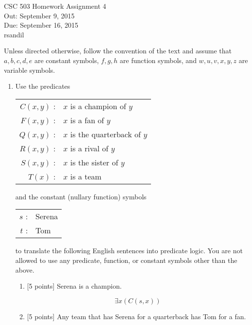 \documentclass{article}
\def\unityid{rsandil}
\begin{document}
\begin{center}
  {\LARGE CSC 503 Homework Assignment 4}\\[1pc]
  Out: September 9, 2015 \\
  Due: September 16, 2015 \\
  \unityid
\end{center}

Unless directed otherwise, follow the convention of the text and
assume that $a,b,c,d,e$ are constant symbols, $f,g,h$ are function
symbols, and $w,u,v,x,y,z$ are variable symbols.

\begin{enumerate}

\item Use the predicates
  \begin{center}
    \begin{tabular}{rl}
      $C(x,y)$ : & $x$ is a champion of $y$ \\
      $F(x,y)$ : & $x$ is a fan of $y$ \\
      $Q(x,y)$ : & $x$ is the quarterback of $y$ \\
      $R(x,y)$ : & $x$ is a rival of $y$ \\
      $S(x,y)$ : & $x$ is the sister of $y$ \\
      $T(x)$   : & $x$ is a team \\
    \end{tabular}
  \end{center}
and the constant (nullary function) symbols
  \begin{center}
    \begin{tabular}{rl}
      $s$ : & Serena \\
      $t$ : & Tom \\
    \end{tabular}
  \end{center}
to translate the following English sentences into predicate logic.
You are not allowed to use any predicate, function, or constant
symbols other than the above.
\begin{enumerate}
\item {[5 points]} Serena is a champion.
\begin{answer}
     \begin{displaymath}
           \exists x(C(s, x))
       \end{displaymath}
\end{answer}
\item {[5 points]} Any team that has Serena for a quarterback has Tom
  for a fan.

\end{enumerate}
\end{enumerate}
\end{document}

